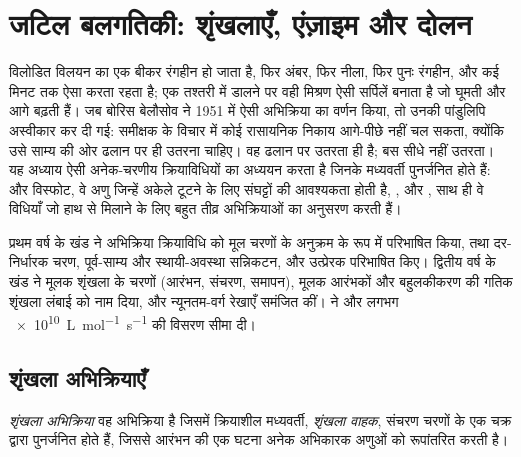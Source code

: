 \chapter{जटिल बलगतिकी: शृंखलाएँ, एंज़ाइम और दोलन}\label{ch:b3:complex-kinetics}

विलोडित विलयन का एक बीकर रंगहीन हो जाता है, फिर अंबर, फिर नीला, फिर
पुनः रंगहीन, और कई मिनट तक ऐसा करता रहता है; एक तश्तरी में डालने पर
वही मिश्रण ऐसी सर्पिलें बनाता है जो घूमती और आगे बढ़ती हैं। जब बोरिस बेलौसोव ने
1951 में ऐसी अभिक्रिया का वर्णन किया, तो उनकी पांडुलिपि अस्वीकार कर दी गई: समीक्षक के
विचार में कोई रासायनिक निकाय आगे-पीछे नहीं चल सकता, क्योंकि उसे साम्य की ओर
ढलान पर ही उतरना चाहिए। वह ढलान पर उतरता ही है; बस सीधे नहीं उतरता।
यह अध्याय ऐसी अनेक-चरणीय क्रियाविधियों का अध्ययन करता है जिनके मध्यवर्ती
पुनर्जनित होते हैं:  और विस्फोट, वे अणु जिन्हें अकेले टूटने के लिए
संघट्टों की आवश्यकता होती है, , और , साथ ही
वे विधियाँ जो हाथ से मिलाने के लिए बहुत तीव्र अभिक्रियाओं का अनुसरण करती हैं।

\begin{recall}
प्रथम वर्ष के खंड ने अभिक्रिया क्रियाविधि को मूल चरणों के अनुक्रम के रूप में परिभाषित किया,
तथा दर-निर्धारक चरण, पूर्व-साम्य और स्थायी-अवस्था
सन्निकटन, और उत्प्रेरक परिभाषित किए। द्वितीय वर्ष के खंड ने मूलक
शृंखला के चरणों (आरंभन, संचरण, समापन), मूलक आरंभकों और
बहुलकीकरण की गतिक शृंखला लंबाई को नाम दिया, और न्यूनतम-वर्ग रेखाएँ समंजित कीं।
 ने  और लगभग
\qty{e10}{L.mol^{-1}.s^{-1}} की विसरण सीमा दी।
\end{recall}

\section{शृंखला अभिक्रियाएँ}

\begin{definition}[शृंखला अभिक्रिया, शृंखला वाहक]\label{def:b3:complex-kinetics:chain}
\emph{शृंखला अभिक्रिया} वह अभिक्रिया है जिसमें क्रियाशील
मध्यवर्ती, \emph{शृंखला वाहक}, संचरण चरणों के एक चक्र द्वारा
पुनर्जनित होते हैं, जिससे आरंभन की एक घटना अनेक
अभिकारक अणुओं को रूपांतरित करती है।
\end{definition}

